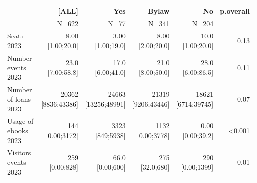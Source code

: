 \documentclass[a4paper,
fontsize=11pt,
oneside,
numbers=noperiodatend,
parskip=half-,
bibliography=totoc,
final
]{scrartcl}
\begin{document}
\begin{landscape}
\begin{table}[]\centering
\begin{tabular}{lrrrrr}
\hline
                                 & \textbf{{[}ALL{]}}       & \textbf{Yes}             & \textbf{Bylaw}           & \textbf{No}            & \textbf{p.overall} \\ \hline
                                 & N=622                    & N=77                     & N=341                    & N=204                  &                    \\ \hline
Seats 2023                       & \makecell{8.00 \\ {[}1.00;20.0{]}}     & \makecell{3.00 \\ {[}1.00;19.0{]}}     & \makecell{8.00 \\ {[}2.00;20.0{]}}     & \makecell{10.0 \\ {[}1.00;20.0{]}}   & 0.13               \\ \hline
Number events 2023               & \makecell{23.0 \\ {[}7.00;58.8{]}}     & \makecell{17.0 \\ {[}6.00;41.0{]}}     & \makecell{21.0 \\ {[}8.00;50.0{]}}     & \makecell{28.0 \\ {[}6.00;86.5{]}}   & 0.11               \\ \hline
Number of loans 2023             & \makecell{20362 \\ {[}8836;43386{]}}   & \makecell{24663 \\ {[}13256;48991{]}}  & \makecell{21319 \\ {[}9206;43446{]}}   & \makecell{18621 \\ {[}6714;39745{]}} & 0.07               \\ \hline
Usage of ebooks 2023             & \makecell{144 \\ {[}0.00;3172{]}}      & \makecell{3323 \\ {[}849;5938{]}}      & \makecell{1132 \\ {[}0.00;3778{]}}     & \makecell{0.00 \\ {[}0.00;39.2{]}}   & \textless{}0.001   \\ \hline
Visitors events 2023             & \makecell{259 \\ {[}0.00;828{]}}       & \makecell{66.0 \\ {[}0.00;600{]}}      & \makecell{275 \\ {[}32.0;680{]}}       & \makecell{290 \\ {[}0.00;1399{]}}    & 0.01               \\ \hline

\end{tabular}
\end{table}
\end{landscape}
\end{document}
